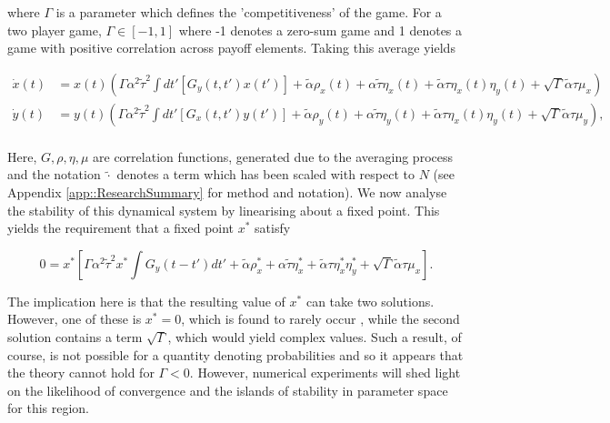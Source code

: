 \documentclass[.../main.tex]{subfiles}
\begin{document}
    where $\Gamma$ is a parameter which defines the 'competitiveness' of the game. For a two player
    game, $\Gamma \in [-1, 1]$ where -1 denotes a zero-sum game and 1 denotes a game with positive
    correlation across payoff elements. Taking this average yields

    \begin{equation}
    \begin{split}
        \dot{x}(t) &= x(t)(\Gamma \alpha^2 \tilde{\tau}^2 \int dt'[G_y(t, t')x(t')] + 
        \tilde{\alpha}
        \rho_x(t) + \alpha \tilde{\tau} \eta_x(t) + \tilde{\alpha} \tau \eta_x(t) \eta_y(t) +
        \sqrt{\Gamma} \tilde{\alpha} \tau \mu_x) \\
        \dot{y}(t) &= y(t)(\Gamma \alpha^2 \tilde{\tau}^2 \int dt'[G_x(t, t')y(t')] + 
        \tilde{\alpha} \rho_y(t) +
        \alpha \tilde{\tau} \eta_y(t) + \tilde{\alpha} \tau \eta_x(t) \eta_y(t)+ 
        \sqrt{\Gamma} \tilde{\alpha} \tau \mu_y), \\
    \end{split}
    \end{equation}

    Here, $G, \rho, \eta, \mu$ are correlation functions, generated due to the averaging process 
    and the notation $\tilde{\cdot}$ denotes a term which has been scaled with respect to $N$ (see
    Appendix \ref{app::ResearchSummary} for method and notation). We now analyse the stability of
    this dynamical system by linearising about a fixed point. This yields the requirement that a
    fixed point $x^*$ satisfy

    \begin{equation}
    0 = x^* \left[\Gamma \alpha^2 \tilde{\tau}^2 x^* \int G_y(t - t') dt' + \tilde{\alpha} \rho_x^* + \alpha \tilde{\tau} \eta_x^* + \tilde{\alpha} \tau \eta_x^* \eta_y^* + \sqrt{\Gamma} \tilde{\alpha} \tau \mu_x \right].
    \end{equation}

    The implication here is that the resulting value of $x^*$ can take two solutions. However, one
    of these is $x^* = 0$, which is found to rarely occur \cite{Coolen2005}, while the second solution
    contains a term $\sqrt{\Gamma}$, which would yield complex values. Such a result, of course, is
    not possible for a quantity denoting probabilities and so it appears that the theory cannot hold
    for $\Gamma < 0$. However, numerical experiments will shed light on the likelihood of
    convergence and the islands of stability in parameter space for this region.
\end{document}
